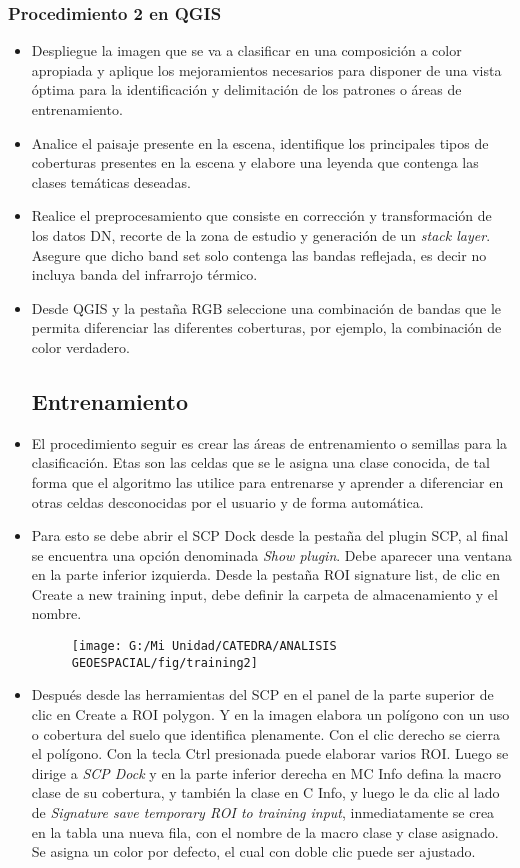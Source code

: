 \documentclass[a4paper,oneside,11pt,]{article}
\begin{document}
\subsubsection{Procedimiento 2 en QGIS}
\begin{itemize}
\item Despliegue la imagen que se va a clasificar en una composición a color apropiada y aplique los mejoramientos necesarios para disponer de una vista óptima para la identificación y delimitación de los patrones o áreas de entrenamiento.
\item Analice el paisaje presente en la escena, identifique los principales tipos de coberturas presentes en la escena y elabore una leyenda que contenga las clases temáticas deseadas.
\item Realice el preprocesamiento que consiste en corrección y transformación de los datos DN, recorte de la zona de estudio y generación de un \emph{stack layer}. Asegure que dicho band set solo contenga las bandas reflejada, es decir no incluya banda del infrarrojo térmico.
\item Desde QGIS y la pestaña RGB seleccione una combinación de bandas que le permita diferenciar las diferentes coberturas, por ejemplo, la combinación de color verdadero. 

\subsection*{Entrenamiento}
\item El procedimiento seguir es crear las áreas de entrenamiento o semillas para la clasificación. Etas son las celdas que se le asigna una clase conocida, de tal forma que el algoritmo las utilice para entrenarse y aprender a diferenciar en otras celdas desconocidas por el usuario y de forma automática.
\item Para esto se debe abrir el SCP Dock desde la pestaña del plugin SCP, al final se encuentra una opción denominada \emph{Show plugin}. Debe aparecer una ventana en la parte inferior izquierda. Desde la pestaña ROI signature list, de clic en Create a new training input, debe definir la carpeta de almacenamiento y el nombre.

\begin{figure}
\centering
\texttt{[image: G:/Mi Unidad/CATEDRA/ANALISIS GEOESPACIAL/fig/training2]}
\end{figure}

\item Después desde las herramientas del SCP en el panel de la parte superior de clic en Create a ROI polygon. Y en la imagen elabora un polígono con un uso o cobertura del suelo que identifica plenamente. Con el clic derecho se cierra el polígono. Con la tecla Ctrl presionada puede elaborar varios ROI. Luego se dirige a \emph{SCP Dock} y en la parte inferior derecha en MC Info defina la macro clase de su cobertura, y también la clase en C Info, y luego le da clic al lado de \emph{Signature save temporary ROI to training input}, inmediatamente se crea en la tabla una nueva fila, con el nombre de la macro clase y clase asignado. Se asigna un color por defecto, el cual con doble clic puede ser ajustado.


\end{itemize}
\end{document}

